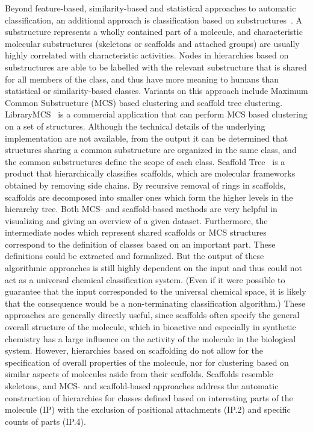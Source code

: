 \documentclass[10pt]{bmc_article}
\newenvironment{bmcformat}{\baselineskip20pt\sloppy\setboolean{publ}{false}}{\baselineskip20pt\sloppy}
\begin{document}
\begin{bmcformat}
Beyond feature-based, similarity-based and statistical approaches to automatic classification, an additional approach is classification based on substructures~\cite{deshpande2005}.  A substructure represents a wholly contained part of a molecule, and characteristic molecular substructures (skeletons or scaffolds and attached groups) are usually highly correlated with characteristic activities.  Nodes in hierarchies based on substructures are able to be labelled with the relevant substructure that is shared for all members of the class, and thus have more meaning to humans than statistical or similarity-based classes. Variants on this approach include Maximum Common Substructure (MCS) based clustering and scaffold tree clustering. LibraryMCS~\cite{librarymcs} is a commercial application that can perform MCS based clustering on a set of structures. Although the technical details of the underlying implementation are not available, from the output it can be determined that structures sharing a common substructure are organized in the same class, and the common substructures define the scope of each class.  Scaffold Tree~\cite{Schuffenhauer2007} is a product that hierarchically classifies scaffolds, which are molecular frameworks obtained by removing side chains.  By recursive removal of rings in scaffolds, scaffolds are decomposed into smaller ones which form the higher levels in the hierarchy tree.  Both MCS- and scaffold-based methods are very helpful in visualizing and giving an overview of a given dataset.  Furthermore, the intermediate nodes which represent shared scaffolds or MCS structures correspond to the definition of classes based on an important part.  These definitions could be extracted and formalized.  But the output of these algorithmic approaches is still highly dependent on the input and thus could not act as a universal chemical classification system. (Even if it were possible to guarantee that the input corresponded to the universal chemical space, it is likely that the consequence would be a non-terminating classification algorithm.)  These approaches are generally directly useful, since scaffolds often specify the general overall structure of the molecule, which in bioactive and especially in synthetic chemistry has a large influence on the activity of the molecule in the biological system.  However, hierarchies based on scaffolding do not allow for the specification of overall properties of the molecule, nor for clustering based on similar aspects of molecules aside from their scaffolds.  Scaffolds resemble skeletons, and MCS- and scaffold-based approaches address the automatic construction of hierarchies for classes defined based on interesting parts of the molecule (IP) with the exclusion of positional attachments (IP.2) and specific counts of parts (IP.4). 


\end{bmcformat}
\end{document}
